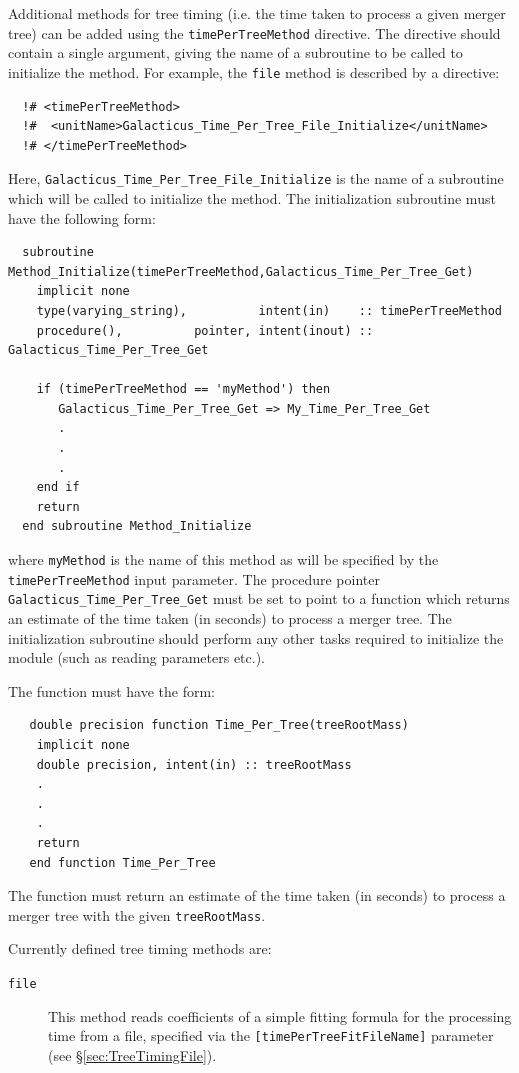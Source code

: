Additional methods for tree timing (i.e. the time taken to process a given merger tree) can be added using the {\tt timePerTreeMethod} directive. The directive should contain a single argument, giving the name of a subroutine to be called to initialize the method. For example, the {\tt file} method is described by a directive:
\begin{verbatim}
  !# <timePerTreeMethod>
  !#  <unitName>Galacticus_Time_Per_Tree_File_Initialize</unitName>
  !# </timePerTreeMethod>
\end{verbatim}
Here, {\tt Galacticus\_Time\_Per\_Tree\_File\_Initialize} is the name of a subroutine which will be called to initialize the method. The initialization subroutine must have the following form:
\begin{verbatim}
  subroutine Method_Initialize(timePerTreeMethod,Galacticus_Time_Per_Tree_Get)
    implicit none
    type(varying_string),          intent(in)    :: timePerTreeMethod
    procedure(),          pointer, intent(inout) :: Galacticus_Time_Per_Tree_Get
    
    if (timePerTreeMethod == 'myMethod') then
       Galacticus_Time_Per_Tree_Get => My_Time_Per_Tree_Get
       .
       .
       .
    end if
    return
  end subroutine Method_Initialize
\end{verbatim}
where {\tt myMethod} is the name of this method as will be specified by the {\tt timePerTreeMethod} input parameter. The procedure pointer {\tt Galacticus\_Time\_Per\_Tree\_Get} must be set to point to a function which returns an estimate of the time taken (in seconds) to process a merger tree. The initialization subroutine should perform any other tasks required to initialize the module (such as reading parameters etc.).

The function must have the form:
\begin{verbatim}
   double precision function Time_Per_Tree(treeRootMass)
    implicit none
    double precision, intent(in) :: treeRootMass
    .
    .
    .
    return
   end function Time_Per_Tree 
\end{verbatim}
The function must return an estimate of the time taken (in seconds) to process a merger tree with the given {\tt treeRootMass}.

Currently defined tree timing methods are:
\begin{description}
 \item [{\tt file}] This method reads coefficients of a simple fitting formula for the processing time from a file, specified via the {\tt [timePerTreeFitFileName]} parameter (see \S\ref{sec:TreeTimingFile}).
\end{description}

